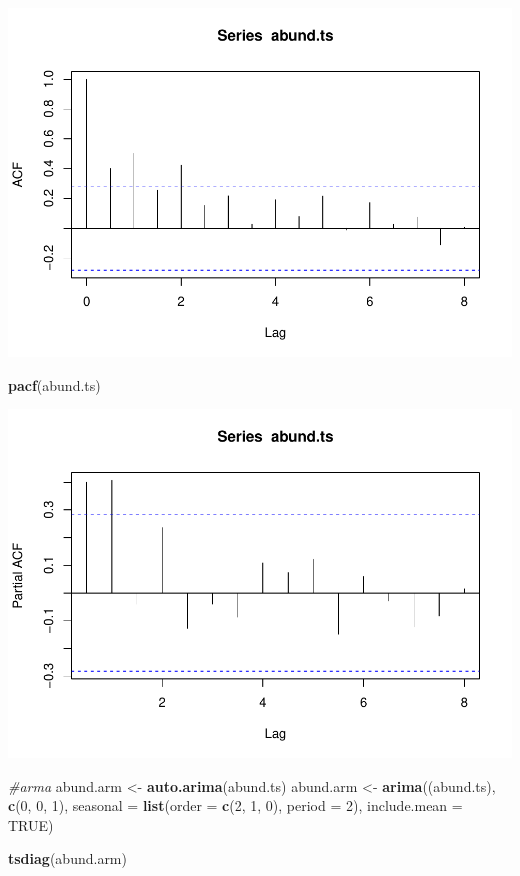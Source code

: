 \documentclass[]{article}
\newenvironment{Shaded}{\begin{snugshade}}{\end{snugshade}}
\newcommand{\KeywordTok}[1]{\textcolor[rgb]{0.13,0.29,0.53}{\textbf{{#1}}}}
\newcommand{\DataTypeTok}[1]{\textcolor[rgb]{0.13,0.29,0.53}{{#1}}}
\newcommand{\DecValTok}[1]{\textcolor[rgb]{0.00,0.00,0.81}{{#1}}}
\newcommand{\StringTok}[1]{\textcolor[rgb]{0.31,0.60,0.02}{{#1}}}
\newcommand{\CommentTok}[1]{\textcolor[rgb]{0.56,0.35,0.01}{\textit{{#1}}}}
\newcommand{\OtherTok}[1]{\textcolor[rgb]{0.56,0.35,0.01}{{#1}}}
\newcommand{\NormalTok}[1]{{#1}}
\begin{document}
\includegraphics{temporal_assignment_files/figure-latex/unnamed-chunk-4-5.pdf}

\begin{Shaded}
\begin{Highlighting}[]
\KeywordTok{pacf}\NormalTok{(abund.ts)}
\end{Highlighting}
\end{Shaded}

\includegraphics{temporal_assignment_files/figure-latex/unnamed-chunk-4-6.pdf}

\begin{Shaded}
\begin{Highlighting}[]
\CommentTok{#arma}
\NormalTok{abund.arm <-}\StringTok{ }\KeywordTok{auto.arima}\NormalTok{(abund.ts)}
\NormalTok{abund.arm <-}\StringTok{ }\KeywordTok{arima}\NormalTok{((abund.ts), }\KeywordTok{c}\NormalTok{(}\DecValTok{0}\NormalTok{, }\DecValTok{0}\NormalTok{, }\DecValTok{1}\NormalTok{), }\DataTypeTok{seasonal =} \KeywordTok{list}\NormalTok{(}\DataTypeTok{order =} \KeywordTok{c}\NormalTok{(}\DecValTok{2}\NormalTok{, }\DecValTok{1}\NormalTok{, }\DecValTok{0}\NormalTok{),}
                                                           \DataTypeTok{period =} \DecValTok{2}\NormalTok{), }\DataTypeTok{include.mean =}
                     \OtherTok{TRUE}\NormalTok{)}


\KeywordTok{tsdiag}\NormalTok{(abund.arm)}
\end{Highlighting}
\end{Shaded}
\end{document}
